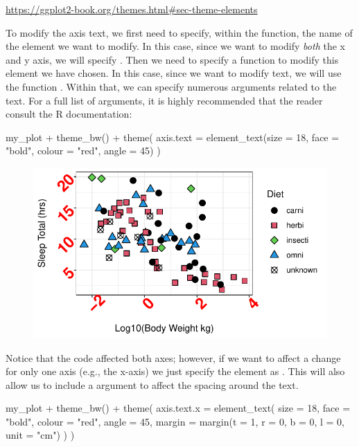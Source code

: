 \begin{center}
\url{https://ggplot2-book.org/themes.html#sec-theme-elements}
\end{center}

To modify the axis text, we first need to specify, within the  function, the name of the element we want to modify. In this case, since we want to modify \textit{both} the x and y axis, we will specify .  Then we need to specify a function to modify this element we have chosen. In this case, since we want to modify text, we will use the function . Within that, we can specify numerous arguments related to the text. For a full list of arguments, it is highly recommended that the reader consult the R documentation: 

\begin{inR}
my_plot + theme_bw() +
  theme(
    axis.text = element_text(size = 18, face = "bold", colour = "red", angle = 45)
  )
\end{inR}

\vspace{2em}

\begin{figure}[H]
\includegraphics[scale = .75]{graphics/ch2Figs/ggEx_33.pdf}
\end{figure}

Notice that the code affected both axes; however, if we want to affect a change for only one axis (e.g., the x-axis) we just specify the element as .  This will also allow us to include a  argument to affect the spacing around the text.

\begin{inR}
my_plot + theme_bw() +
  theme(
    axis.text.x = element_text(
      size = 18, face = "bold", colour = "red", angle = 45,
      margin = margin(t = 1, r = 0, b = 0, l = 0, unit = "cm")
    )
  )
\end{inR}

